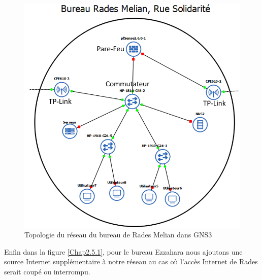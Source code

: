 \begin{figure}[H]
\centering
\includegraphics[width=15cm]{Images/BRadesMelian-Topologie.png}
\caption{Topologie du réseau du bureau de Rades Melian dans GNS3}
\label{Chap2.4.1}
\end{figure}

Enfin dans la figure \ref{Chap2.5.1}, pour le bureau Ezzahara nous ajoutons une source Internet supplémentaire à notre réseau au cas où l'accès Internet de Rades serait coupé ou interrompu.

